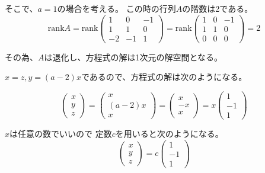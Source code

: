 \documentclass[12pt,b5paper]{ltjsarticle}
\begin{document}
そこで、$a=1$の場合を考える。
この時の行列$A$の階数は2である。
\begin{equation}
 \mathrm{rank} A
  = \mathrm{rank}
  \begin{pmatrix}
   1 & 0 & -1\\
   1 & 1 & 0\\
   -2 & -1 & 1
  \end{pmatrix}
  = \mathrm{rank}
 \begin{pmatrix}
   1 & 0 & -1\\
   1 & 1 & 0\\
   0 & 0 & 0
 \end{pmatrix}
  = 2
\end{equation}

その為、$A$は退化し、方程式の解は1次元の解空間となる。

$x=z,y=(a-2)x$であるので、方程式の解は次のようになる。

\begin{equation}
 \begin{pmatrix}
  x \\ y \\ z
 \end{pmatrix}
 =
 \begin{pmatrix}
  x \\ (a-2)x \\ x
 \end{pmatrix}
 =
 \begin{pmatrix}
  x \\ -x \\ x
 \end{pmatrix}
 =
 x
 \begin{pmatrix}
  1 \\ -1 \\ 1
 \end{pmatrix}
\end{equation}

$x$は任意の数でいいので
定数$c$を用いると次のようになる。
\begin{equation}
 \begin{pmatrix}
  x \\ y \\ z
 \end{pmatrix}
 =
 c
 \begin{pmatrix}
  1 \\ -1 \\ 1
 \end{pmatrix}
\end{equation}


\hrulefill
\end{document}
